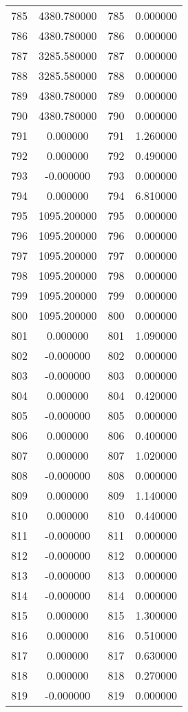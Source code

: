\documentclass[12pt]{article}
\begin{document}
\begin{longtable}{@{}cccc@{}}
785 & 4380.780000 & 785 & 0.000000 \\
786 & 4380.780000 & 786 & 0.000000 \\
787 & 3285.580000 & 787 & 0.000000 \\
788 & 3285.580000 & 788 & 0.000000 \\
789 & 4380.780000 & 789 & 0.000000 \\
790 & 4380.780000 & 790 & 0.000000 \\
791 & 0.000000 & 791 & 1.260000 \\
792 & 0.000000 & 792 & 0.490000 \\
793 & -0.000000 & 793 & 0.000000 \\
794 & 0.000000 & 794 & 6.810000 \\
795 & 1095.200000 & 795 & 0.000000 \\
796 & 1095.200000 & 796 & 0.000000 \\
797 & 1095.200000 & 797 & 0.000000 \\
798 & 1095.200000 & 798 & 0.000000 \\
799 & 1095.200000 & 799 & 0.000000 \\
800 & 1095.200000 & 800 & 0.000000 \\
801 & 0.000000 & 801 & 1.090000 \\
802 & -0.000000 & 802 & 0.000000 \\
803 & -0.000000 & 803 & 0.000000 \\
804 & 0.000000 & 804 & 0.420000 \\
805 & -0.000000 & 805 & 0.000000 \\
806 & 0.000000 & 806 & 0.400000 \\
807 & 0.000000 & 807 & 1.020000 \\
808 & -0.000000 & 808 & 0.000000 \\
809 & 0.000000 & 809 & 1.140000 \\
810 & 0.000000 & 810 & 0.440000 \\
811 & -0.000000 & 811 & 0.000000 \\
812 & -0.000000 & 812 & 0.000000 \\
813 & -0.000000 & 813 & 0.000000 \\
814 & -0.000000 & 814 & 0.000000 \\
815 & 0.000000 & 815 & 1.300000 \\
816 & 0.000000 & 816 & 0.510000 \\
817 & 0.000000 & 817 & 0.630000 \\
818 & 0.000000 & 818 & 0.270000 \\
819 & -0.000000 & 819 & 0.000000 \\

\end{longtable}
\end{document}
